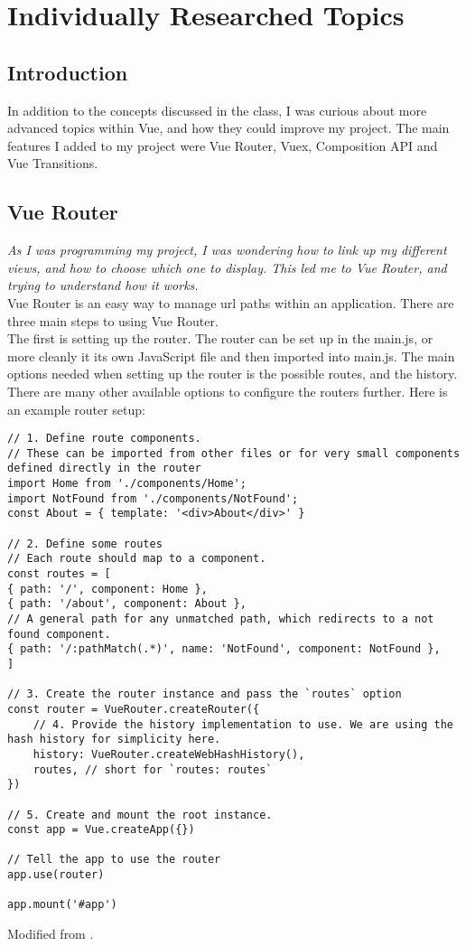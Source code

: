 \documentclass[portfolio.tex]{subfiles}
\begin{document}
	\section{Individually Researched Topics}
		\subsection{Introduction}
			In addition to the concepts discussed in the class, I was curious about more advanced topics within Vue, and how they could improve my project. The main features I added to my project were Vue Router, Vuex, Composition API and Vue Transitions.

		\subsection{Vue Router}
			\textit{As I was programming my project, I was wondering how to link up my different views, and how to choose which one to display. This led me to Vue Router, and trying to understand how it works.}\\

			Vue Router is an easy way to manage url paths within an application. There are three main steps to using Vue Router. \\

			The first is setting up the router. The router can be set up in the main.js, or more cleanly it its own JavaScript file and then imported into main.js. The main options needed when setting up the router is the possible routes, and the history. There are many other available options to configure the routers further. Here is an example router setup:\\

			\begin{lstlisting}
// 1. Define route components.
// These can be imported from other files or for very small components defined directly in the router
import Home from './components/Home';
import NotFound from './components/NotFound';
const About = { template: '<div>About</div>' }

// 2. Define some routes
// Each route should map to a component.
const routes = [
{ path: '/', component: Home },
{ path: '/about', component: About },
// A general path for any unmatched path, which redirects to a not found component.
{ path: '/:pathMatch(.*)', name: 'NotFound', component: NotFound },
]

// 3. Create the router instance and pass the `routes` option
const router = VueRouter.createRouter({
	// 4. Provide the history implementation to use. We are using the hash history for simplicity here.
	history: VueRouter.createWebHashHistory(),
	routes, // short for `routes: routes`
})

// 5. Create and mount the root instance.
const app = Vue.createApp({})

// Tell the app to use the router
app.use(router)

app.mount('#app')
			\end{lstlisting}
		Modified from \autocite{vue-router}.\\
\end{document}
